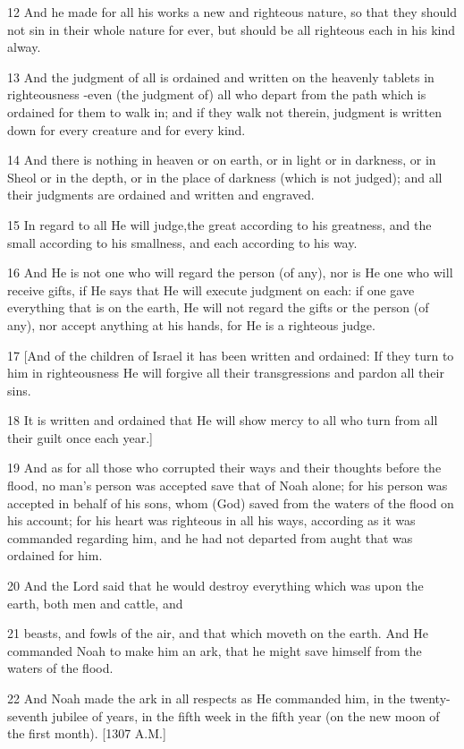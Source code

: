 \par 12 And he made for all his works a new and righteous nature, so that they should not sin in their whole nature for ever, but should be all righteous each in his kind alway.
\par 13 And the judgment of all is ordained and written on the heavenly tablets in righteousness -even (the judgment of) all who depart from the path which is ordained for them to walk in; and if they walk not therein, judgment is written down for every creature and for every kind.
\par 14 And there is nothing in heaven or on earth, or in light or in darkness, or in Sheol or in the depth, or in the place of darkness (which is not judged); and all their judgments are ordained and written and engraved.
\par 15 In regard to all He will judge,the great according to his greatness, and the small according to his smallness, and each according to his way.
\par 16 And He is not one who will regard the person (of any), nor is He one who will receive gifts, if He says that He will execute judgment on each: if one gave everything that is on the earth, He will not regard the gifts or the person (of any), nor accept anything at his hands, for He is a righteous judge.
\par 17 [And of the children of Israel it has been written and ordained: If they turn to him in righteousness He will forgive all their transgressions and pardon all their sins.
\par 18 It is written and ordained that He will show mercy to all who turn from all their guilt once each year.]
\par 19 And as for all those who corrupted their ways and their thoughts before the flood, no man's person was accepted save that of Noah alone; for his person was accepted in behalf of his sons, whom (God) saved from the waters of the flood on his account; for his heart was righteous in all his ways, according as it was commanded regarding him, and he had not departed from aught that was ordained for him.
\par 20 And the Lord said that he would destroy everything which was upon the earth, both men and cattle, and
\par 21 beasts, and fowls of the air, and that which moveth on the earth. And He commanded Noah to make him an ark, that he might save himself from the waters of the flood.
\par 22 And Noah made the ark in all respects as He commanded him, in the twenty-seventh jubilee of years, in the fifth week in the fifth year (on the new moon of the first month). [1307 A.M.]
